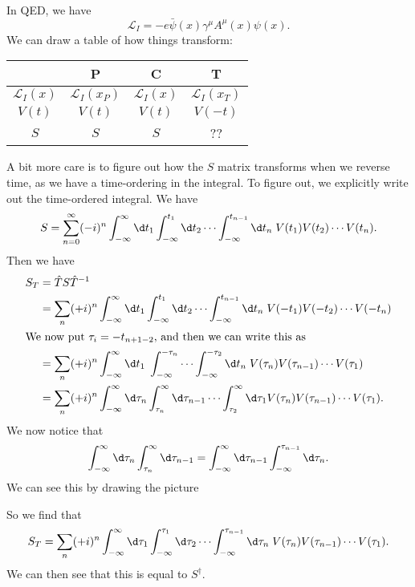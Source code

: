 \documentclass[a4paper]{article}
\begin{document}
\begin{eg}
  In QED, we have
  \[
    \mathcal{L}_I = - e \bar\psi (x) \gamma^\mu A^\mu (x) \psi(x).
  \]
  We can draw a table of how things transform:
  \begin{center}
    \begin{tabular}{cccc}
      \toprule
      & P & C & T\\
      \midrule
      $\mathcal{L}_I(x)$ & $\mathcal{L}_I(x_P)$ & $\mathcal{L}_I(x)$ & $\mathcal{L}_I(x_T)$\\
      $V(t)$ & $V(t)$ & $ V(t)$ & $V(-t)$ \\
      $S$ & $S$ & $S$ & ??\\
      \bottomrule
    \end{tabular}
  \end{center}
  A bit more care is to figure out how the $S$ matrix transforms when we reverse time, as we have a time-ordering in the integral. To figure out, we explicitly write out the time-ordered integral. We have
  \[
    S = \sum_{n = 0}^\infty (-i)^n \int_{-\infty}^\infty \d t_1 \int_{-\infty}^{t_1} \d t_2 \cdots \int_{-\infty}^{t_{n - 1}} \d t_n\; V(t_1) V(t_2) \cdots V(t_n).
  \]
  Then we have
  \begin{align*}
    S_T &= \hat{T} S\hat{T}^{-1} \\
    &= \sum_n (+i)^n \int_{-\infty}^\infty \d t_1 \int_{-\infty}^{t_1} \d t_2 \cdots \int_{-\infty}^{t_{n - 1}} \d t_n\; V(-t_1) V(-t_2) \cdots V(-t_n)\\
    \intertext{We now put $\tau_i = -t_{n + 1 - 2}$, and then we can write this as}
    &= \sum_n (+i)^n \int_{-\infty}^\infty \d t_1 \; \int_{-\infty}^{-\tau_n} \cdots \int_{-\infty}^{-\tau_2} \d t_n\; V(\tau_n) V(\tau_{n - 1}) \cdots V(\tau_1)\\
    &= \sum_n (+i)^n \int_{-\infty}^\infty \d \tau_n \int_{\tau_n}^\infty \d \tau_{n - 1} \cdots \int_{\tau_2}^\infty \d \tau_1 V(\tau_n) V(\tau_{n - 1}) \cdots V(\tau_1).
  \end{align*}
  We now notice that
  \[
    \int_{-\infty}^\infty \d \tau_n \int_{\tau_n}^\infty \d \tau_{n - 1} = \int_{-\infty}^\infty \d \tau_{n - 1} \int_{-\infty}^{\tau_{n - 1}} \d \tau_n.
  \]
  We can see this by drawing the picture
  \begin{center}
  \end{center}
  So we find that
  \[
    S_T = \sum_n (+i)^n \int_{-\infty}^\infty \d \tau_1 \int_{-\infty}^{\tau_1} \d \tau_2 \cdots \int_{-\infty}^{\tau_{n - 1}} \d \tau_n \; V(\tau_n) V(\tau_{n - 1}) \cdots V(\tau_1).
  \]
  We can then see that this is equal to $S^\dagger$.


\end{eg}
\end{document}
